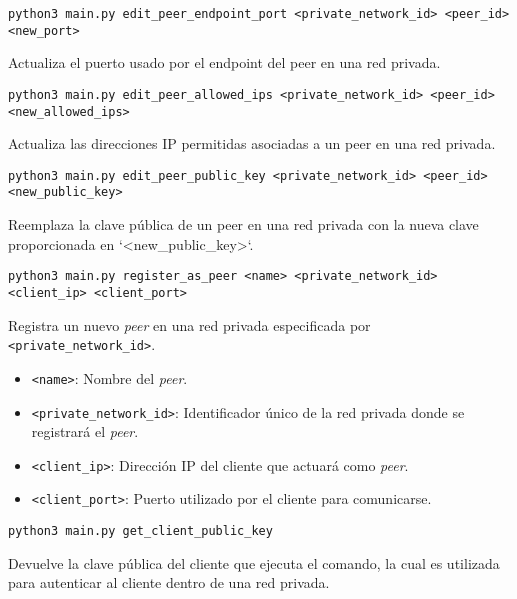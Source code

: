     \begin{Verbatim}[breaklines=true]
    python3 main.py edit_peer_endpoint_port <private_network_id> <peer_id> <new_port>
    \end{Verbatim} 
    Actualiza el puerto usado por el endpoint del peer en una red privada.
    
    \begin{Verbatim}[breaklines=true]
    python3 main.py edit_peer_allowed_ips <private_network_id> <peer_id> <new_allowed_ips>
    \end{Verbatim} 
    Actualiza las direcciones IP permitidas asociadas a un peer en una red privada.
    
    \begin{Verbatim}[breaklines=true]
    python3 main.py edit_peer_public_key <private_network_id> <peer_id> <new_public_key>
    \end{Verbatim}
    Reemplaza la clave pública de un peer en una red privada con la nueva clave proporcionada en `<new\_public\_key>`.
     
    \begin{Verbatim}[breaklines=true]
        python3 main.py register_as_peer <name> <private_network_id> <client_ip> <client_port>
    \end{Verbatim}
    
    Registra un nuevo \textit{peer} en una red privada especificada por \texttt{<private\_network\_id>}.  
        \begin{itemize}
            \item \texttt{<name>}: Nombre del \textit{peer}.
            \item \texttt{<private\_network\_id>}: Identificador único de la red privada donde se registrará el \textit{peer}.
            \item \texttt{<client\_ip>}: Dirección IP del cliente que actuará como \textit{peer}.
            \item \texttt{<client\_port>}: Puerto utilizado por el cliente para comunicarse.
        \end{itemize}
        
    \begin{Verbatim}[breaklines=true]
        python3 main.py get_client_public_key
    \end{Verbatim}
    Devuelve la clave pública del cliente que ejecuta el comando, la cual es utilizada para autenticar al cliente dentro de una red privada.
    
